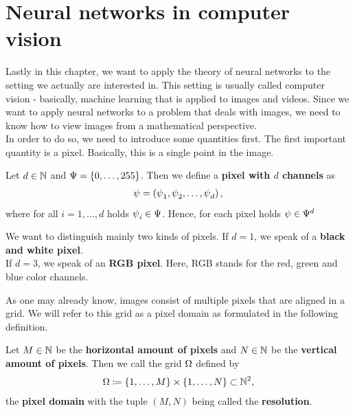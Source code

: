 \section{Neural networks in computer vision}

Lastly in this chapter, we want to apply the theory of neural networks to the setting we actually are interested in. This setting is usually called computer vision - basically, machine learning that is applied to images and videos. Since we want to apply neural networks to a problem that deals with images, we need to know how to view images from a mathematical perspective.\\
In order to do so, we need to introduce some quantities first. The first important quantity is a pixel. Basically, this is a single point in the image.


\begin{definition}\label{def:pixel}
Let $d\in\N$ and $\P=\{0,\ldots,255\}$. Then we define a \textbf{pixel with $d$ channels} as
\begin{align*}
\p = \left(\p_1, \p_2,\ldots, \p_d\right),
\end{align*}
where for all $i=1,\ldots,d$ holds $\p_i\in\P$. Hence, for each pixel holds $\p\in\P^d$
\end{definition}


\begin{remark}
We want to distinguish mainly two kinds of pixels. If $d=1$, we speak of a \textbf{black and white pixel}.\\
If $d=3$, we speak of an \textbf{RGB pixel}. Here, RGB stands for the  red, green and blue color channels.
\end{remark}


As one may already know, images consist of multiple pixels that are aligned in a grid. We will refer to this grid as a pixel domain as formulated in the following definition.


\begin{definition}\label{def:pixel_domain}
Let $M\in\N$ be the \textbf{horizontal amount of pixels} and $N\in\N$ be the \textbf{vertical amount of pixels}. Then we call the grid $\O$ defined by
\begin{align*}
\O \coloneqq \left\{1, \ldots, M\right\} \times \left\{1,\ldots, N\right\} \subset \N^2,
\end{align*}
the \textbf{pixel domain} with the tuple $(M,N)$ being called the \textbf{resolution}.
\end{definition}


